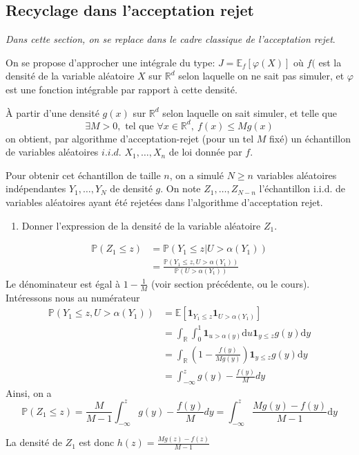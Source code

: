 \documentclass[
]{article}
\providecommand{\tightlist}{%
  \setlength{\itemsep}{0pt}\setlength{\parskip}{0pt}}
\newenvironment{Correction}%
  { \vspace{\baselineskip}\begin{mdframed}[backgroundcolor=my_green]}%
  {\end{mdframed}}
\begin{document}
\hypertarget{recyclage-dans-lacceptation-rejet}{%
\subsection{Recyclage dans l'acceptation
rejet}\label{recyclage-dans-lacceptation-rejet}}

\emph{Dans cette section, on se replace dans le cadre classique de
l'acceptation rejet}.

On se propose d'approcher une intégrale du type:
\(J = \mathbb{E}_f[\varphi(X)]\) où \(f(\) est la densité de la variable
aléatoire \(X\) sur \(\mathbb{R}^d\) selon laquelle on ne sait pas
simuler, et \(\varphi\) est une fonction intégrable par rapport à cette
densité.

À partir d'une densité \(g(x)\) sur \(\mathbb{R}^d\) selon laquelle on
sait simuler, et telle que
\[\exists M>0,\text{ tel que } \forall x\in \mathbb{R}^d,~f(x) \leq Mg(x)\]
on obtient, par algorithme d'acceptation-rejet (pour un tel \(M\) fixé)
un échantillon de variables aléatoires \(i.i.d.\) \(X_1,\dots, X_n\) de
loi donnée par \(f\).

Pour obtenir cet échantillon de taille \(n\), on a simulé \(N\geq n\)
variables aléatoires indépendantes \(Y_1,\dots, Y_N\) de densité \(g\).
On note \(Z_1,\dots,Z_{N - n}\) l'échantillon i.i.d. de variables
aléatoires ayant été rejetées dans l'algorithme d'acceptation rejet.

\begin{enumerate}
\def\labelenumi{\arabic{enumi}.}
\setcounter{enumi}{4}
\tightlist
\item
  Donner l'expression de la densité de la variable aléatoire \(Z_1\).
\end{enumerate}

\begin{Correction}
\begin{align*}
\mathbb{P}(Z_1 \leq z) &= \mathbb{P}\left(Y_1\leq z \vert U > \alpha(Y_1)\right)\\
&= \frac{\mathbb{P}\left(Y_1\leq z , U > \alpha(Y_1)\right)}{\mathbb{P}\left(U > \alpha(Y_1)\right)}
\end{align*}
Le dénominateur est égal à $1 - \frac{1}{M}$ (voir section précédente, ou le cours).
Intéressons nous au numérateur
\begin{align*}
\mathbb{P}\left(Y_1\leq z , U > \alpha(Y_1)\right) &= \mathbb{E}\left[\mathbf{1}_{Y_1\leq z} \mathbf{1}_{U > \alpha(Y_1)}\right]\\
&=\int_{\mathbb{R}}\int_{0}^{1} \mathbf{1}_{u > \alpha(y)} \text{d} u \mathbf{1}_{y \leq z} g(y) \text{d} y\\
&=\int_{\mathbb{R}} \left(1 - \frac{f(y)}{Mg(y)}\right)  \mathbf{1}_{y \leq z} g(y) \text{d} y\\
&= \int_{-\infty}^z g(y) - \frac{f(y)}{M} dy
\end{align*}
Ainsi, on a
$$\mathbb{P}(Z_1\leq z) = \frac{M}{M - 1} \int_{-\infty}^z g(y) - \frac{f(y)}{M} dy = \int_{-\infty}^z \frac{Mg(y) - f(y)}{M - 1} \text{d}y$$

La densité de $Z_1$ est donc $h(z) = \frac{Mg(z) - f(z)}{M - 1}$ 
\end{Correction}
\end{document}
